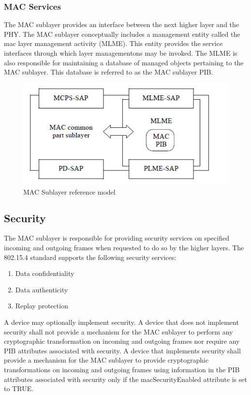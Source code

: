 \subsubsection{MAC Services}
The MAC sublayer provides an interface between the next higher layer and the PHY. The MAC sublayer conceptually includes a management entity called the mac layer management activity (MLME). This entity provides the service interfaces through which layer managementons may be invoked. The MLME is also responsible for maintaining a database of managed objects pertaining to the MAC sublayer. This database is referred to as the MAC sublayer PIB.
\begin{figure}[ht]
	\centering
	\includegraphics[scale=1]{images/macsublayer.png}
	\caption{MAC Sublayer reference model}
\end{figure}
\subsection{Security}
The MAC sublayer is responsible for providing security services on specified incoming and outgoing frames when requested to do so by the higher layers. The 802.15.4 standard supports the following security services:
\begin{enumerate}
	\item{Data confidentiality}
	\item{Data authenticity}
	\item{Replay protection}
\end{enumerate}
A device may optionally implement security. A device that does not implement security shall not provide a mechanism for the MAC sublayer to perform any cryptographic transformation on incoming and outgoing frames nor require any PIB attributes associated with security. A device that implements security shall provide a mechanism for the MAC sublayer to provide cryptographic transformations on incoming and outgoing frames using information in the PIB attributes associated with security only if the macSecurityEnabled attribute is set to TRUE.\\
